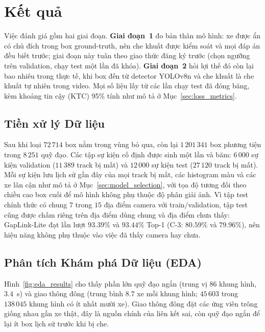 \chapter{Kết quả}
\label{chap:results}

Việc đánh giá gồm hai giai đoạn. \textbf{Giai đoạn~1} đo bản thân mô hình: xe được ẩn có chủ đích trong box ground-truth, nên che khuất được kiểm soát và mọi đáp án đều biết trước; giai đoạn này tuân theo giao thức đăng ký trước (chọn ngưỡng trên validation, chạy test một lần đã khóa). \textbf{Giai đoạn~2} hỏi lợi thế đó còn lại bao nhiêu trong thực tế, khi box đến từ detector YOLOv8n và che khuất là che khuất tự nhiên trong video. Mọi số liệu lấy từ các lần chạy test đã đóng băng, kèm khoảng tin cậy (KTC) 95\% tính như mô tả ở Mục~\ref{sec:loss_metrics}.

\section{Tiền xử lý Dữ liệu}
\label{sec:data_preprocessing}

Sau khi loại $72\,714$ box nằm trong vùng bỏ qua, còn lại $1\,201\,341$ box phương tiện trong $8\,251$ quỹ đạo. Các tập sự kiện cố định được sinh một lần và băm: $6\,000$ sự kiện validation ($11\,389$ track bị mất) và $12\,000$ sự kiện test ($27\,120$ track bị mất). Mỗi sự kiện lưu lịch sử gần đây của mọi track bị mất, các histogram màu và các xe lân cận như mô tả ở Mục~\ref{sec:model_selection}, với tọa độ tương đối theo chiều cao box cuối để mô hình không phụ thuộc độ phân giải ảnh. Vì tập test chính thức có chung $7$ trong $15$ địa điểm camera với train/validation, tập test cũng được chấm riêng trên địa điểm dùng chung và địa điểm chưa thấy: GapLink-Lite đạt lần lượt $93.39\%$ và $93.44\%$ Top-1 (C-3: $80.59\%$ và $79.96\%$), nên hiệu năng không phụ thuộc vào việc đã thấy camera hay chưa.

\section{Phân tích Khám phá Dữ liệu (EDA)}
\label{sec:eda}

Hình~\ref{fig:eda_results} cho thấy phần lớn quỹ đạo ngắn (trung vị $86$ khung hình, $3.4$~s) và giao thông đông (trung bình $8.7$ xe mỗi khung hình; $45\,603$ trong $138\,045$ khung hình có ít nhất mười xe). Giao thông đông đặt các ứng viên trông giống nhau gần xe thật, đây là nguồn chính của liên kết sai, còn quỹ đạo ngắn để lại ít box lịch sử trước khi bị che.

